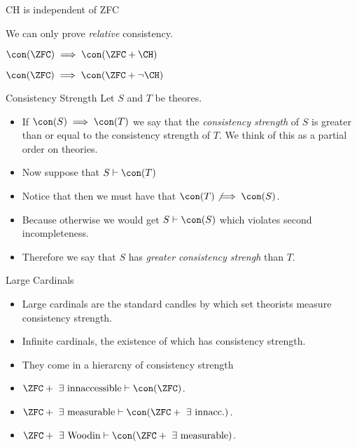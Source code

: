 \documentclass{beamer}
\begin{document}
\begin{frame}{CH is independent of ZFC}

\pause

We can only prove \emph{relative} consistency.

\pause

\begin{theorem}[G\"{o}del, 1938]
$\con(\ZFC) \implies \con(\ZFC + \CH)$
\end{theorem}

\begin{theorem}[Cohen, 1963]
$\con(\ZFC) \implies \con(\ZFC + \neg\CH)$
\end{theorem}

\end{frame}

\begin{frame}{Consistency Strength}
Let $S$ and $T$ be theores.
\begin{itemize}
\item If $\con(S) \implies \con(T)$ we say that the \emph{consistency strength}
of $S$ is greater than or equal to the consistency strength of $T$. We think
of this as a partial order on theories.
\item Now suppose that $S\vdash\con(T)$
\item Notice that then we must have that $\con(T) \not\implies \con(S)$.
\item Because otherwise we would get $S\vdash\con(S)$ which violates second
incompleteness.
\item Therefore we say that $S$ has
\emph{greater consistency strengh} than $T$.
\end{itemize}
\end{frame}

\begin{frame}{Large Cardinals}

\begin{itemize}
\item Large cardinals are the standard candles by which set theorists
measure consistency strength.
\item Infinite cardinals, the existence of which has consistency strength.
\item They come in a hierarcny of consistency strength
\item $\ZFC + \text{ } \exists \text{ innaccessible} \vdash \con(\ZFC)$.
\item $\ZFC + \text{ } \exists \text{ measurable} \vdash \con(\ZFC + \text{ } \exists \text{ innacc.})$.
\item $\ZFC + \text{ } \exists \text{ Woodin} \vdash \con(\ZFC + \text{ } \exists \text{ measurable})$.
\end{itemize}

\end{frame}
\end{document}
